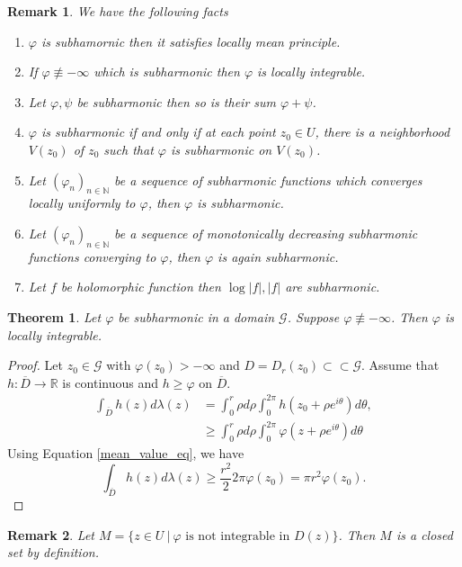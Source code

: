 \documentclass{article}
\newtheorem{theorem}{Theorem} [section]
\newtheorem{remark}{Remark}[section]
\newcommand{\N}[0]{\mathbb{N}}
\newcommand{\R}[0]{\mathbb{R}}
\newcommand{\G}[0]{\mathcal{G}}
\newcommand{\sep}[0]{\:|\:}
\begin{document}
\begin{remark}We have the following facts
  \begin{enumerate}[1).]
    \item $\varphi$ is subhamornic then it satisfies locally mean principle.
    \item If $\varphi\not\equiv -\infty$ which is subharmonic then $\varphi$ is locally integrable.
    \item Let $\varphi,\psi$ be subharmonic then so is their sum $\varphi+\psi$.
    \item $\varphi$ is subharmonic if and only if at each point $z_0\in U$, there is a neighborhood $V(z_0)$ of $z_0$ such that $\varphi$ is subharmonic on $V(z_0)$. 
    \item Let $(\varphi_n)_{n\in\N}$ be a sequence of subharmonic functions which converges locally uniformly to $\varphi$, then $\varphi$ is subharmonic.
    \item Let $(\varphi_n)_{n\in\N}$ be a sequence of monotonically decreasing subharmonic functions converging to $\varphi$, then $\varphi$ is again subharmonic.
    \item Let $f$ be holomorphic function then $\log\vert f\vert,\vert f\vert$ are subharmonic.
  \end{enumerate}
\end{remark}

\begin{theorem}
  Let $\varphi$ be subharmonic in a domain $\G$. Suppose $\varphi\not\equiv -\infty$. Then $\varphi$ is locally integrable.
\end{theorem}

\begin{proof}
  Let $z_0\in\G$ with $\varphi(z_0)>-\infty$ and $D= D_r(z_0)\subset\subset\G$. Assume that $h:\overline{D}\to\R$ is continuous and $h\geq \varphi$ on $\overline{D}$. 
  \begin{align*}
    \int_{\overline{D}}h(z)d\lambda(z) & = \int_0^r\rho d\rho\int_0^{2\pi}h(z_0+\rho e^{i\theta})d\theta,\\
    &\geq \int_0^r\rho d\rho\int_0^{2\pi}\varphi(z+\rho e^{i\theta})d\theta
  \end{align*}
  Using Equation \ref{mean_value_eq}, we have 
  \begin{equation*}
    \int_{\overline{D}}h(z)d\lambda(z)\geq {\frac {r^2} 2}2\pi\varphi(z_0) = \pi r^2\varphi(z_0).
  \end{equation*}
\end{proof}
\begin{remark}
Let $M = \{z\in U\sep \varphi\text{ is not integrable in $D(z)$}\}$. Then $M$ is a closed set by definition.
\end{remark}
\end{document}
